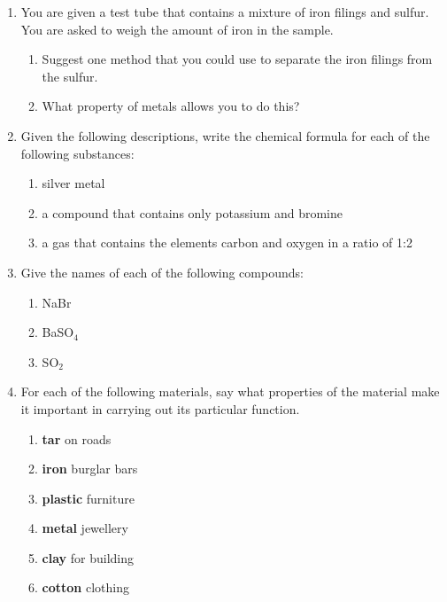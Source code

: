 {\begin{enumerate}
\item{You are given a test tube that contains a mixture of iron filings and sulfur. You are asked to weigh the amount of iron in the sample.
	\begin{enumerate}
	\item{Suggest one method that you could use to separate the iron filings from the sulfur.}
	\item{What property of metals allows you to do this?}
	\end{enumerate}}

\item{Given the following descriptions, write the chemical formula for each of the following substances:
	\begin{enumerate}
	\item{silver metal}
	\item{a compound that contains only potassium and bromine}
	\item{a gas that contains the elements carbon and oxygen in a ratio of 1:2}
	\end{enumerate}}

\item{Give the names of each of the following compounds:
	\begin{enumerate}
	\item{NaBr}
	\item{BaSO$_{4}$}
	\item{SO$_{2}$}
	\end{enumerate}}
\item{For each of the following materials, say what properties of the material make it important in carrying out its particular function.

	\begin{enumerate}
	\item{\textbf{tar} on roads}
	\item{\textbf{iron} burglar bars}
	\item{\textbf{plastic} furniture}
	\item{\textbf{metal} jewellery}
	\item{\textbf{clay} for building}
	\item{\textbf{cotton} clothing}
	\end{enumerate}
}

\end{enumerate}
}








